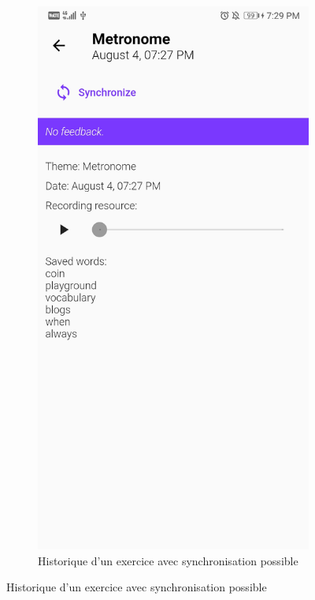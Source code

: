 \begin{appendices}
\begin{landscape}
\begin{figure}[h]
\begin{subfigure}{.25\textwidth}
    \includegraphics[width=.75\linewidth]{content/imgs/screen12.jpg}
    \caption{Historique d'un exercice avec synchronisation possible}
  \end{subfigure}
\end{figure}



\end{landscape}
\end{appendices}
